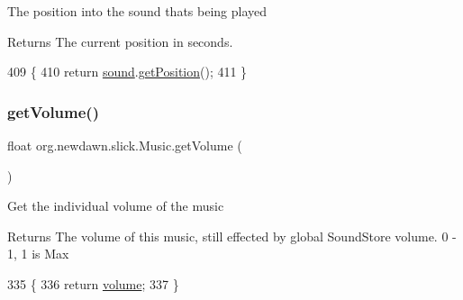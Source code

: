 The position into the sound thats being played

\begin{DoxyReturn}{Returns}
The current position in seconds. 
\end{DoxyReturn}

\begin{DoxyCode}
409                                 \{
410         \textcolor{keywordflow}{return} \mbox{\hyperlink{classorg_1_1newdawn_1_1slick_1_1_music_a17daed326f24bf361ff8677c33f06b2f}{sound}}.\mbox{\hyperlink{interfaceorg_1_1newdawn_1_1slick_1_1openal_1_1_audio_aa838b5606c0aa5f23dd46ac5918bb717}{getPosition}}();
411     \}
\end{DoxyCode}
\mbox{\label{classorg_1_1newdawn_1_1slick_1_1_music_a834f88da09d93163e857587c4e2908f6}} 
\subsubsection{\texorpdfstring{get\+Volume()}{getVolume()}}
{\footnotesize\ttfamily float org.\+newdawn.\+slick.\+Music.\+get\+Volume (\begin{DoxyParamCaption}{ }\end{DoxyParamCaption})\hspace{0.3cm}{\ttfamily [inline]}}

Get the individual volume of the music \begin{DoxyReturn}{Returns}
The volume of this music, still effected by global Sound\+Store volume. 0 -\/ 1, 1 is Max 
\end{DoxyReturn}

\begin{DoxyCode}
335                              \{
336         \textcolor{keywordflow}{return} \mbox{\hyperlink{classorg_1_1newdawn_1_1slick_1_1_music_a2fa10b80767b1a05925e1dc89a088e90}{volume}};
337     \}
\end{DoxyCode}
\mbox{\label{classorg_1_1newdawn_1_1slick_1_1_music_aadc35375936c47d7a0e40cd1d719d070}} 
